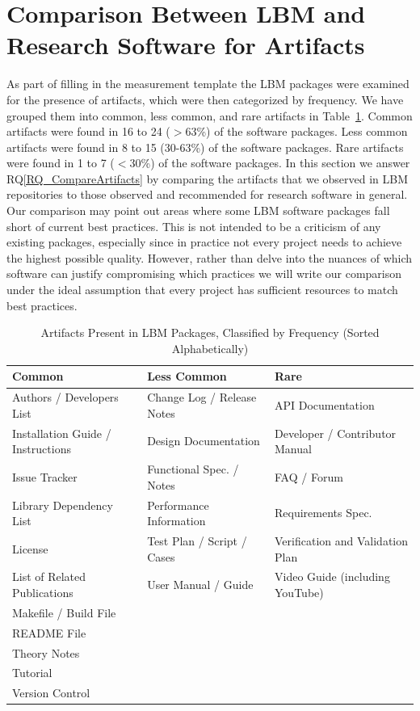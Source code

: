\documentclass[final, 3p, times, authoryear]{elsarticle}
\newcommand{\rqref}[1]{RQ\ref{#1}}
\begin{document}
\section{Comparison Between LBM and Research Software for Artifacts}
\label{Sec_CompareArtifacts}

As part of filling in the measurement template the LBM packages were examined
for the presence of artifacts, which were then categorized by frequency. We have
grouped them into common, less common, and rare artifacts in
Table~\ref{artifactspresent}. Common artifacts were found in 16 to 24 ($>$63\%)
of the software packages. Less common artifacts were found in 8 to 15 (30-63\%)
of the software packages. Rare artifacts were found in 1 to 7 ($<$30\%) of the
software packages.  In this section we answer \rqref{RQ_CompareArtifacts} by
comparing the artifacts that we observed in LBM repositories to those observed
and recommended for research software in general. Our comparison may point out
areas where some LBM software packages fall short of current best practices.
This is not intended to be a criticism of any existing packages, especially
since in practice not every project needs to achieve the highest possible
quality.  However, rather than delve into the nuances of which software can
justify compromising which practices we will write our comparison under the
ideal assumption that every project has sufficient resources to match best
practices.

\begin{table}[ht!]
\begin{center}
\begin{tabular}{ p{5.3 cm} p{4.9 cm} p{5 cm}}
\toprule
\textbf{Common} & \textbf{Less Common} & \textbf{Rare} \\
\midrule
Authors / Developers List & Change Log / Release Notes & API Documentation\\
Installation Guide / Instructions & Design Documentation & Developer / Contributor Manual\\
Issue Tracker & Functional Spec. / Notes & FAQ / Forum\\
Library Dependency List & Performance Information & Requirements Spec.\\
License & Test Plan / Script / Cases & Verification and
Validation Plan\\
List of Related Publications & User Manual / Guide & Video Guide
(including YouTube)\\
Makefile / Build File &  & \\
README File & & \\
Theory Notes & & \\
Tutorial & & \\
Version Control & & \\
\bottomrule
\end{tabular}
\caption{Artifacts Present in LBM Packages, Classified by Frequency (Sorted Alphabetically)}
\label{artifactspresent}
\end{center}
\end{table}
\end{document}
